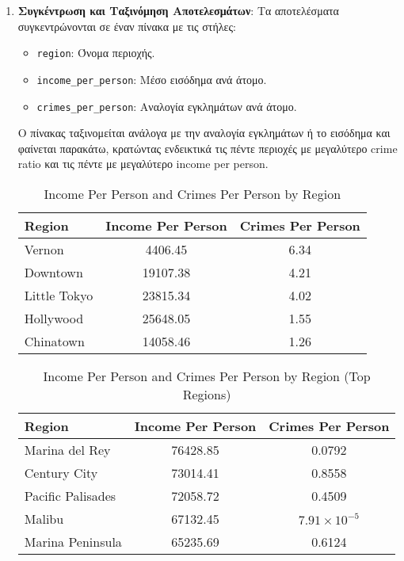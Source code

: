 \documentclass{article}
\begin{document}
\begin{enumerate}
    \item \textbf{Συγκέντρωση και Ταξινόμηση Αποτελεσμάτων}:
    Τα αποτελέσματα συγκεντρώνονται σε έναν πίνακα με τις στήλες:
    \begin{itemize}
        \item \texttt{region}: Όνομα περιοχής.
        \item \texttt{income\_per\_person}: Μέσο εισόδημα ανά άτομο.
        \item \texttt{crimes\_per\_person}: Αναλογία εγκλημάτων ανά άτομο.
    \end{itemize}
    Ο πίνακας ταξινομείται ανάλογα με την αναλογία εγκλημάτων ή το εισόδημα και φαίνεται παρακάτω, κρατώντας ενδεικτικά τις πέντε περιοχές με μεγαλύτερο crime ratio και τις πέντε με μεγαλύτερο income per person. 
\begin{table}[H]
\centering
\caption{Income Per Person and Crimes Per Person by Region}
\label{tab:income_crimes}
\begin{tabular}{|l|c|c|}
\hline
\textbf{Region} & \textbf{Income Per Person} & \textbf{Crimes Per Person} \\ \hline
Vernon         & 4406.45                    & 6.34                       \\ \hline
Downtown       & 19107.38                   & 4.21                       \\ \hline
Little Tokyo   & 23815.34                   & 4.02                       \\ \hline
Hollywood      & 25648.05                   & 1.55                       \\ \hline
Chinatown      & 14058.46                   & 1.26                       \\ \hline
\end{tabular}
\end{table}

\begin{table}[H]
\centering
\caption{Income Per Person and Crimes Per Person by Region (Top Regions)}
\label{tab:top_income_crimes}
\begin{tabular}{|l|c|c|}
\hline
\textbf{Region}               & \textbf{Income Per Person} & \textbf{Crimes Per Person} \\ \hline
Marina del Rey                & 76428.85                   & 0.0792                     \\ \hline
Century City                  & 73014.41                   & 0.8558                     \\ \hline
Pacific Palisades             & 72058.72                   & 0.4509                     \\ \hline
Malibu                        & 67132.45                   & $7.91 \times 10^{-5}$      \\ \hline
Marina Peninsula              & 65235.69                   & 0.6124                     \\ \hline
\end{tabular}
\end{table}


\end{enumerate}
\end{document}
